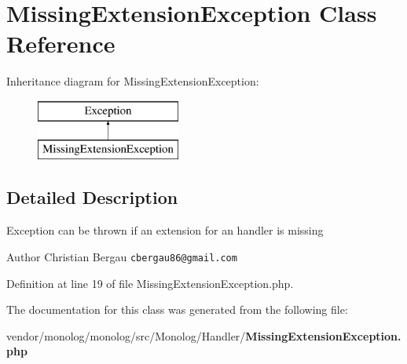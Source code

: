 \section{Missing\+Extension\+Exception Class Reference}
\label{class_monolog_1_1_handler_1_1_missing_extension_exception}
Inheritance diagram for Missing\+Extension\+Exception\+:\begin{figure}[H]
\begin{center}
\leavevmode
\includegraphics[height=2.000000cm]{class_monolog_1_1_handler_1_1_missing_extension_exception}
\end{center}
\end{figure}


\subsection{Detailed Description}
Exception can be thrown if an extension for an handler is missing

\begin{DoxyAuthor}{Author}
Christian Bergau {\tt cbergau86@gmail.\+com} 
\end{DoxyAuthor}


Definition at line 19 of file Missing\+Extension\+Exception.\+php.



The documentation for this class was generated from the following file\+:\begin{DoxyCompactItemize}
\item 
vendor/monolog/monolog/src/\+Monolog/\+Handler/{\bf Missing\+Extension\+Exception.\+php}\end{DoxyCompactItemize}
